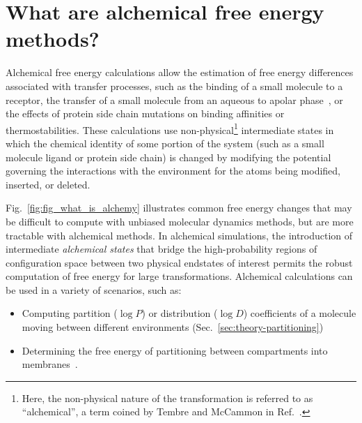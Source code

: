 \documentclass[9pt,bestpractices]{livecoms}
\begin{document}

\section{What are alchemical free energy methods?}
\label{sec:intro}
Alchemical free energy calculations allow the estimation of free energy differences associated with transfer processes, such as the binding of a small molecule to a receptor, the transfer of a small molecule from an aqueous to apolar phase~\cite{zwanzig1954hightemperature}, or the effects of protein side chain mutations on binding affinities or thermostabilities. 
 These calculations use non-physical\footnote{Here, the non-physical nature of the transformation is referred to as ``alchemical'', a term coined by Tembre and McCammon in Ref.~\cite{tembre1984ligandreceptor}.} intermediate states in which the chemical identity of some portion of the system (such as a small molecule ligand or protein side chain) is changed by modifying the potential governing the interactions with the environment for the atoms being modified, inserted, or deleted. 

Fig.~\ref{fig:fig_what_is_alchemy} illustrates common free energy changes that may be difficult to compute with unbiased molecular dynamics methods, but are more tractable with alchemical methods.
In alchemical simulations, the introduction of intermediate \textit{alchemical states} that bridge the high-probability regions of configuration space between two physical endstates of interest permits the robust computation of free energy for large transformations.
Alchemical calculations can be used in a variety of scenarios, such as: 
\begin{itemize}
\item Computing partition ($\log P$) or distribution ($\log D$) coefficients of a molecule moving between different environments (Sec.~\ref{sec:theory-partitioning})~\cite{rustenburg2016measuring, bosisio2016blinded} 
\item Determining the free energy of partitioning between compartments into membranes~\cite{corey2019insights}. 
\end{itemize}
\end{document}
